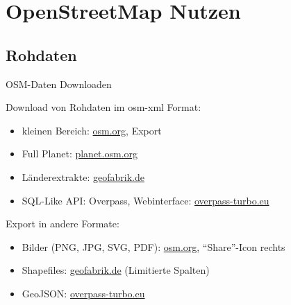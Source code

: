 \documentclass{beamer}
\begin{document}
%
%
%


\section{OpenStreetMap Nutzen}

\subsection{Rohdaten}

\begin{frame}{OSM-Daten Downloaden}

	Download von Rohdaten im osm-xml Format:
\begin{itemize}
	\item kleinen Bereich: \href{http://osm.org}{osm.org}, Export
	\item Full Planet: \href{http://planet.osm.org}{planet.osm.org}
	\item Länderextrakte: \href{http://download.geofabrik.de}{geofabrik.de}
	\item SQL-Like API: Overpass, Webinterface: \href{http://overpass-turbo.eu}{overpass-turbo.eu}
\end{itemize}
\pause
Export in andere Formate: 
\begin{itemize}
	\item Bilder (PNG, JPG, SVG, PDF): \href{http://osm.org}{osm.org}, "`Share"'-Icon rechts
	\item Shapefiles: \href{http://download.geofabrik.de}{geofabrik.de} (Limitierte Spalten)
	\item GeoJSON: \href{http://overpass-turbo.eu}{overpass-turbo.eu}
\end{itemize}

\end{frame}
\end{document}
